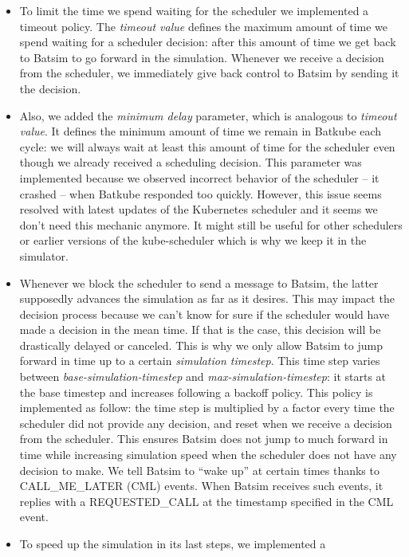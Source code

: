 \begin{itemize}[leftmargin=*]
	\item To limit the time we spend waiting for the scheduler we
		implemented a timeout policy. The \textit{timeout value}
		defines the maximum amount of time we spend waiting for a
		scheduler decision: after this amount of time we get back to
		Batsim to go forward in the simulation. Whenever we receive a
		decision from the scheduler, we immediately give back control
		to Batsim by sending it the decision. 
	\item Also, we added the \textit{minimum delay} parameter, which is
		analogous to \textit{timeout value}. It defines the minimum
		amount of time we remain in Batkube each cycle: we will always
		wait at least this amount of time for the scheduler even though
		we already received a scheduling decision. This parameter was
		implemented because we observed incorrect behavior of the
		scheduler -- it crashed -- when Batkube responded too quickly.
		However, this issue seems resolved with latest updates of the
		Kubernetes scheduler and it seems we don't need this mechanic
		anymore. It might still be useful for other schedulers or
		earlier versions of the kube-scheduler which is why we keep it
		in the simulator.
	\item Whenever we block the scheduler to send a message to Batsim, the
		latter supposedly advances the simulation as far as it desires.
		This may impact the decision process because we can't know for
		sure if the scheduler would have made a decision in the mean
		time. If that is the case, this decision will be drastically
		delayed or canceled. This is why we only allow Batsim to jump
		forward in time up to a certain \textit{simulation timestep}.
		This time step varies between \textit{base-simulation-timestep}
		and \textit{max-simulation-timestep}: it starts at the base
		timestep and increases following a backoff policy. This policy
		is implemented as follow: the time step is multiplied by a
		factor every time the scheduler did not provide any decision,
		and reset when we receive a decision from the scheduler. This
		ensures Batsim does not jump to much forward in time while
		increasing simulation speed when the scheduler does not have
		any decision to make. We tell Batsim to ``wake up'' at certain
		times thanks to CALL\_ME\_LATER (CML) events. When Batsim
		receives such events, it replies with a REQUESTED\_CALL at the
		timestamp specified in the CML event.
	\item To speed up the simulation in its last steps, we implemented a

\end{itemize}
